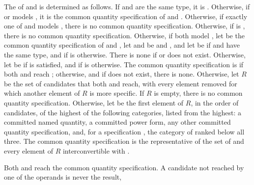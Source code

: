 \begin{itemdescr}
\pnum
The  of  and 
is determined as follows.
If  and  are the same type, it is .
Otherwise, if  or  models ,
it is the common quantity specification of
 and .
Otherwise, if exactly one of  and 
models , there is no common quantity specification.
Otherwise, if  is ,
there is no common quantity specification.
Otherwise, if both model ,
let  be the common quantity specification of
 and ,
let  and  be  and ,
and let  be  if  and  have the same type,
and 
if  is  otherwise.
There is none if  or  does not exist.
Otherwise, let  be 
if  is satisfied,
and  if  is  otherwise.
The common quantity specification is  if both  and  reach ;
otherwise, and if  does not exist, there is none.
Otherwise, let $R$ be the set of candidates that both  and  reach,
with every element removed for which another element of $R$ is more specific.
If $R$ is empty, there is no common quantity specification.
Otherwise, let  be the first element of $R$, in the order of candidates,
of the highest of the following categories, listed from the highest:
a committed named quantity, a committed power form, any other committed quantity specification,
and, for a specification , the category of  ranked below all three.
The common quantity specification is the representative of the set of
 and every element of $R$ interconvertible with .
\begin{note}
Both  and  reach the common quantity specification.
A candidate not reached by one of the operands is never the result,

\end{note}
\end{itemdescr}
